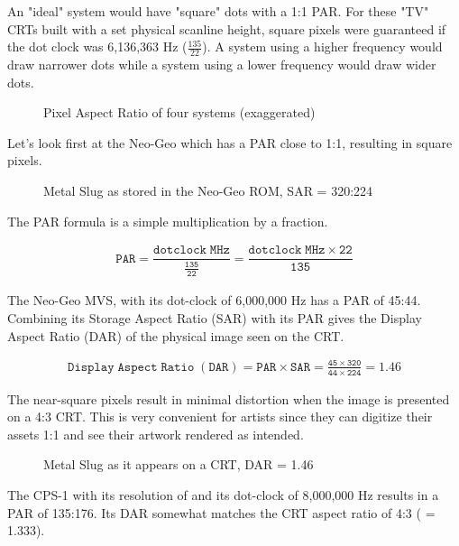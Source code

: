 An "ideal" system would have "square" dots with a 1:1 PAR. For these "TV" CRTs built with a set physical scanline height, square pixels were guaranteed if the dot clock was 6,136,363 Hz ($\frac{135}{22}$). A system using a higher frequency would draw narrower dots while a system using a lower frequency would draw wider dots.

\begin{figure}[H]
\caption*{Pixel Aspect Ratio of four systems (exaggerated)}
\end{figure}


Let's look first at the Neo-Geo which has a PAR close to 1:1, resulting in square pixels\cite{par}.

\vfill
\begin{figure}[H]
\caption*{Metal Slug as stored in the Neo-Geo ROM, SAR = 320:224}
\end{figure}


The PAR formula is a simple multiplication by a fraction.

\begin{align*}
 \mathtt{PAR = \dfrac{dotclock\;MHz}{\frac{135}{22}} = \dfrac{dotclock\;MHz \times 22}{135}}
\end{align*}

The Neo-Geo MVS, with its dot-clock of 6,000,000 Hz has a PAR of 45:44. Combining its  Storage Aspect Ratio (SAR) with its PAR gives the Display Aspect Ratio (DAR) of the physical image seen on the CRT.

\begin{align*}
 \mathtt{Display\;Aspect\;Ratio\;(DAR) = PAR \times SAR = \frac{45\times320}{44\times224} = 1.46}
\end{align*}

The near-square pixels result in minimal distortion when the image is presented on a 4:3 CRT. This is very convenient for artists since they can digitize their assets 1:1 and see their artwork rendered as intended.

\vfill
\begin{figure}[H]
\caption*{Metal Slug as it appears on a CRT, DAR = 1.46}
\end{figure}





The CPS-1 with its resolution of  and its dot-clock of 8,000,000 Hz results in a PAR of 135:176. Its DAR somewhat matches the CRT aspect ratio of 4:3 ( = 1.333). 

